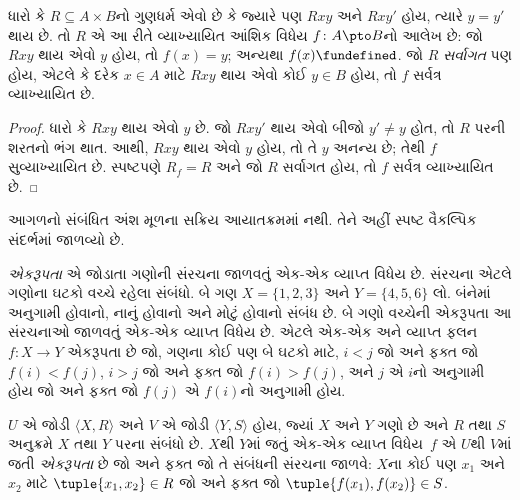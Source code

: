 \begin{prop}
ધારો કે $R \subseteq A \times B$નો ગુણધર્મ એવો છે કે
જ્યારે પણ $Rxy$ અને $Rxy'$ હોય, ત્યારે $y = y'$ થાય છે.
તો $R$ એ આ રીતે વ્યાખ્યાયિત આંશિક વિધેય
$f\colon A \pto B$નો આલેખ છે: જો $Rxy$ થાય એવો $y$
હોય, તો $f(x) = y$; અન્યથા $f(x) \fundefined$.
જો $R$ \emph{સર્વાગત} પણ હોય, એટલે કે દરેક $x \in A$
માટે $Rxy$ થાય એવો કોઈ $y \in B$ હોય, તો $f$
સર્વત્ર વ્યાખ્યાયિત છે.
\end{prop}

\begin{proof}
ધારો કે $Rxy$ થાય એવો $y$ છે. જો $Rxy'$ થાય એવો
બીજો $y'
\neq y$ હોત, તો $R$ પરની શરતનો ભંગ થાત.
આથી, $Rxy$ થાય એવો $y$ હોય, તો તે $y$ અનન્ય છે;
તેથી $f$ સુવ્યાખ્યાયિત છે. સ્પષ્ટપણે $R_f = R$
અને જો $R$ સર્વાગત હોય, તો $f$ સર્વત્ર વ્યાખ્યાયિત છે.
\end{proof}
\endgroup


\OLEndChapterHook


\begin{editorial}
આગળનો સંબંધિત અંશ મૂળના સક્રિય આયાતક્રમમાં નથી. તેને અહીં સ્પષ્ટ વૈકલ્પિક સંદર્ભમાં જાળવ્યો છે.
\end{editorial}
\begingroup
\makeatletter{}\makeatother

\label{guunit:OLP-0717}


\begin{explain}
\emph{એકરૂપતા} એ જોડાતા ગણોની સંરચના જાળવતું એક-એક વ્યાપ્ત વિધેય છે.
સંરચના એટલે ગણોના ઘટકો વચ્ચે રહેલા સંબંધો.
બે ગણ $X=\{1,2,3\}$ અને $Y=\{4,5,6\}$ લો.
બંનેમાં અનુગામી હોવાનો, નાનું હોવાનો અને મોટું હોવાનો સંબંધ છે.
બે ગણો વચ્ચેની એકરૂપતા આ સંરચનાઓ જાળવતું એક-એક વ્યાપ્ત વિધેય છે.
એટલે એક-એક અને વ્યાપ્ત ફલન~$f \colon X
\to Y$ એકરૂપતા છે જો, ગણના કોઈ પણ બે ઘટકો માટે,
$i<j$ જો અને ફક્ત જો $f(i)<f(j)$,
$i>j$ જો અને ફક્ત જો $f(i)>f(j)$,
અને $j$ એ $i$નો અનુગામી હોય જો અને ફક્ત જો $f(j)$ એ
$f(i)$નો અનુગામી હોય.
\end{explain}

\begin{defn}[એકરૂપતા]
$U$ એ જોડી $\langle X, R\rangle$ અને $V$ એ જોડી
$\langle Y, S\rangle$ હોય, જ્યાં $X$ અને $Y$ ગણો છે અને
$R$ તથા $S$ અનુક્રમે $X$ તથા $Y$ પરના સંબંધો છે.
$X$થી $Y$માં જતું એક-એક વ્યાપ્ત વિધેય~$f$ એ $U$થી $V$માં જતી
\emph{એકરૂપતા} છે જો અને ફક્ત જો તે સંબંધની સંરચના જાળવે:
$X$ના કોઈ પણ $x_{1}$ અને $x_{2}$ માટે
$\tuple{x_1,x_2} \in R$ જો અને ફક્ત જો
$\tuple{f(x_1),f(x_2)} \in S$.
\end{defn}

